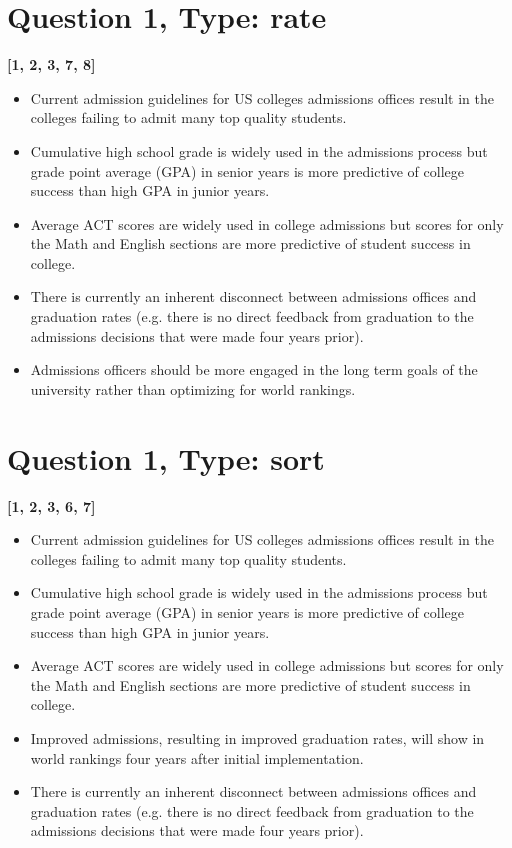 \documentclass[10pt]{article}
\begin{document}
\section{Question 1, Type: rate}
\textbf{[1, 2, 3, 7, 8]}
\begin{itemize}
\item Current admission guidelines for US colleges admissions offices result in the colleges failing to admit many top quality students.
\item Cumulative high school grade is widely used in the admissions process but grade point average (GPA) in senior years is more predictive of college success than high GPA in junior years.
\item Average ACT scores are widely used in college admissions but scores for only the Math and English sections are more predictive of student success in college.
\item There is currently an inherent disconnect between admissions offices and graduation rates (e.g. there is no direct feedback from graduation to the admissions decisions that were made four years prior).
\item Admissions officers should be more engaged in the long term goals of the university rather than optimizing for world rankings.
\end{itemize}

\section{Question 1, Type: sort}
\textbf{[1, 2, 3, 6, 7]}
\begin{itemize}
\item Current admission guidelines for US colleges admissions offices result in the colleges failing to admit many top quality students.
\item Cumulative high school grade is widely used in the admissions process but grade point average (GPA) in senior years is more predictive of college success than high GPA in junior years.
\item Average ACT scores are widely used in college admissions but scores for only the Math and English sections are more predictive of student success in college.
\item Improved admissions, resulting in improved graduation rates, will show in world rankings four years after initial implementation.
\item There is currently an inherent disconnect between admissions offices and graduation rates (e.g. there is no direct feedback from graduation to the admissions decisions that were made four years prior).
\end{itemize}
\end{document}
